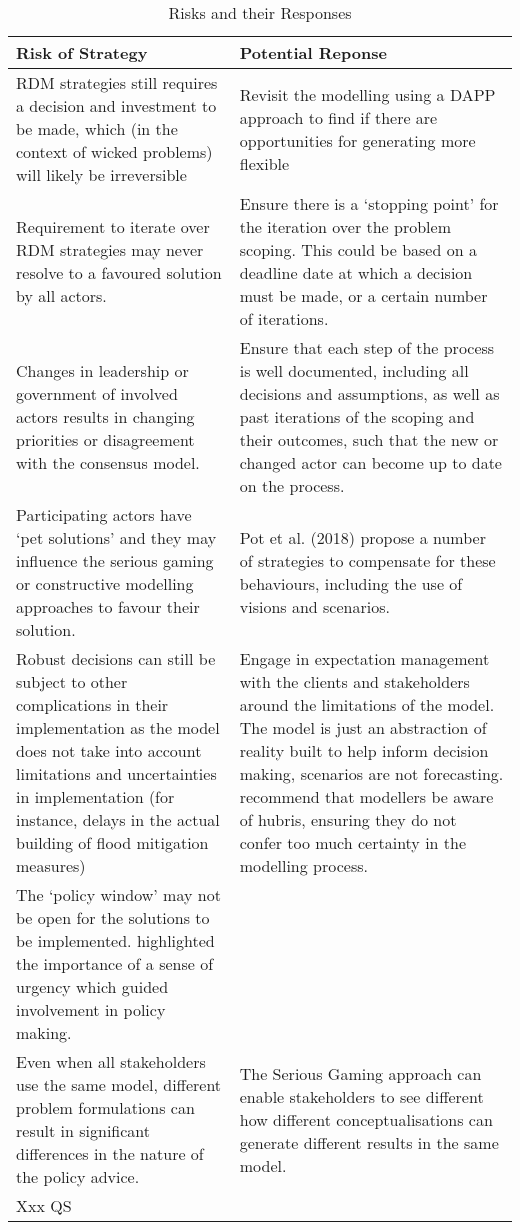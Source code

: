 \begin{table}[h!]
\caption{Risks and their Responses}
\label{tab:pr-risks-and-responses}
\centering
\begin{tabular}{p{}|p{}}
\hline
Risk of Strategy &
  Potential Reponse \\ \hline
RDM strategies still requires a decision and investment to be made, which (in the context of wicked problems) will likely be irreversible &
  Revisit the modelling using a DAPP approach to find if there are opportunities for generating more flexible \\ \hline
Requirement to iterate over RDM strategies may never resolve to a favoured solution by all actors. &
  Ensure there is a ‘stopping point’ for the iteration over the problem scoping. This could be based on a deadline date at which a decision must be made, or a certain number of iterations. \\ \hline
Changes in leadership or government of involved actors results in changing priorities or disagreement with the consensus model. &
  Ensure that each step of the process is well documented, including all decisions and assumptions, as well as past iterations of the scoping and their outcomes, such that the new or changed actor can become up to date on the process. \\ \hline
Participating actors have ‘pet solutions’ and they may influence the serious gaming or constructive modelling approaches to favour their solution. &
  Pot et al. (2018) propose a number of strategies to compensate for these behaviours, including the use of visions and scenarios. \\ \hline
Robust decisions can still be subject to other complications in their implementation as the model does not take into account limitations and uncertainties in implementation (for instance, delays in the actual building of flood mitigation measures) &
  Engage in expectation management with the clients and stakeholders around the limitations of the model. The model is just an abstraction of reality built to help inform decision making, scenarios are not forecasting. \cite{saltelli_five_2020} recommend that modellers be aware of hubris, ensuring they do not confer too much certainty in the modelling process. \\ \hline
The ‘policy window’ may not be open for the solutions to be implemented. \cite{rijke_room_2012} highlighted the importance of a sense of urgency which guided involvement in policy making. &
   \\ \hline
Even when all stakeholders use the same model, different problem formulations can result in significant differences in the nature of the policy advice. &
  The Serious Gaming approach can enable stakeholders to see different how different conceptualisations can generate different results in the same model. \\ \hline
Xxx QS & 
  
\end{tabular}
\end{table}

